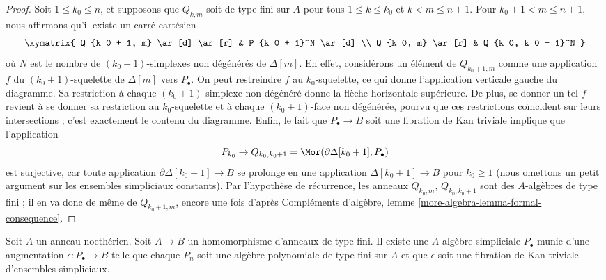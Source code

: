 \begin{proof}
\medskip\noindent
Soit $1 \leq k_0 \leq n$, et supposons que $Q_{k, m}$ soit de type fini sur
$A$ pour tous $1 \leq k \leq k_0$ et $k < m \leq n + 1$.
Pour $k_0 + 1 < m \leq n + 1$, nous affirmons qu'il existe un carré cartésien
$$
\xymatrix{
Q_{k_0 + 1, m} \ar[d] \ar[r] & P_{k_0 + 1}^N \ar[d] \\
Q_{k_0, m} \ar[r] & Q_{k_0, k_0 + 1}^N
}
$$
où $N$ est le nombre de $(k_0 + 1)$-simplexes non dégénérés de $\Delta[m]$.
En effet, considérons un élément de $Q_{k_0 + 1, m}$ comme une application $f$
du $(k_0 + 1)$-squelette de $\Delta[m]$ vers $P_\bullet$. On peut restreindre
$f$ au $k_0$-squelette, ce qui donne l'application verticale gauche du
diagramme. Sa
restriction à chaque $(k_0 + 1)$-simplexe non dégénéré donne la flèche
horizontale supérieure. De plus, se donner un tel $f$ revient à se donner sa
restriction au $k_0$-squelette et à chaque $(k_0 + 1)$-face non dégénérée,
pourvu que ces restrictions coïncident sur leurs intersections ; c'est
exactement le contenu du diagramme. Enfin, le fait que
$P_\bullet \to B$ soit une fibration de Kan triviale implique que
l'application
$$
P_{k_0} \to Q_{k_0, k_0 + 1} = \Mor(\partial \Delta[k_0 + 1], P_\bullet)
$$
est surjective, car toute application $\partial \Delta[k_0 + 1] \to B$ se
prolonge en une application $\Delta[k_0 + 1] \to B$ pour $k_0 \geq 1$ (nous
omettons un petit argument sur les ensembles simpliciaux constants). Par
l'hypothèse de récurrence, les anneaux $Q_{k_0, m}$,
$Q_{k_0, k_0 + 1}$ sont des $A$-algèbres de type fini ; il en va donc de même
de $Q_{k_0 + 1, m}$, encore une fois d'après Compléments d'algèbre, lemme
\ref{more-algebra-lemma-formal-consequence}.
\end{proof}

\begin{proposition}
\label{proposition-polynomial}
Soit $A$ un anneau noethérien. Soit $A \to B$ un homomorphisme d'anneaux de
type fini. Il existe une $A$-algèbre simpliciale $P_\bullet$ munie d'une
augmentation $\epsilon : P_\bullet \to B$ telle que chaque $P_n$ soit une
algèbre polynomiale de type fini sur $A$ et que $\epsilon$ soit une fibration
de Kan triviale d'ensembles simpliciaux.
\end{proposition}

